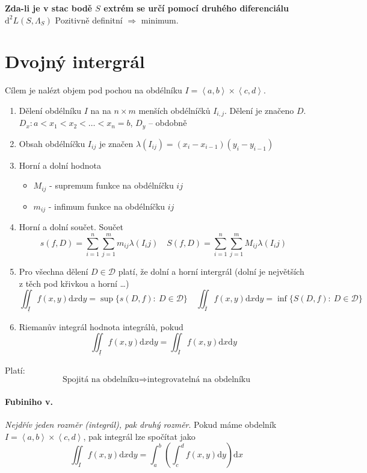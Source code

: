 \documentclass[a4paper, twoside,%
12pt]{article}
\newcommand{\dif}{\mathrm{d}}
\begin{document}
\textbf{Zda-li je v stac bodě $S$ extrém se určí pomocí druhého diferenciálu $\dif^2 L(S, \Lambda_S)$} Pozitivně definitní $\Rightarrow$ minimum.

\section{Dvojný intergrál}

Cílem je nalézt objem pod pochou na obdélníku $I = \left< a,b\right> \times \left<c,d\right>$. 

\begin{enumerate}
    \item Dělení obdélníku $I$ na na $n\times m$ menších obdélníčků $I_{i,j}$. Dělení je značeno $D$. $D_x: a<x_1<x_2<\dots<x_n=b$, $D_y$ -- obdobně 
    \item Obsah obdélníčku $I_{ij}$ je značen $\lambda(I_{ij}) = (x_i - x_{i-1})(y_i - y_{i-1})$
    \item Horní a dolní hodnota 
    \begin{itemize}
        \item $M_{ij}$ - supremum funkce na obdélníčku $ij$
        \item $m_{ij}$ - infimum funkce na obdélníčku $ij$
    \end{itemize}
    \item Horní a dolní součet. Součet 
    $$s(f,D) = \sum_{i=1}^n \sum_{j=1}^m m_{ij} \lambda(I_ij) \quad S(f,D) = \sum_{i=1}^n \sum_{j=1}^m M_{ij} \lambda(I_ij)$$
    \item Pro všechna dělení $D \in \mathscr{D}$ platí, že dolní a horní intergrál (dolní je největších z těch pod křivkou a horní \dots)
    $$ \iint_{\underline{I}} f(x,y)\dif x\dif y = \sup\lbrace s(D,f): \: D \in \mathscr{D} \rbrace \quad \iint_{\overline{I}} f(x,y)\dif x\dif y = \inf\lbrace S(D,f): \: D \in \mathscr{D} \rbrace $$
    \item Riemanův integrál hodnota integrálů, pokud 
    $$ \iint_{\underline{I}} f(x,y)\dif x\dif y = \iint_{\overline{I}} f(x,y)\dif x\dif y $$
\end{enumerate}

Platí:
$$ \text{Spojitá na obdelníku} \Rightarrow \text{integrovatelná na obdelníku}$$

\paragraph{Fubiniho v.} \emph{Nejdřív jeden rozměr (integrál), pak druhý rozměr}. Pokud máme obdelník $I = \left< a,b\right> \times \left<c,d\right>$, pak integrál lze spočítat jako 
$$ \iint_I f(x,y)\dif x\dif y = \int_a^b \left( \int_c^d f(x,y) \dif y\right) \dif x  $$
\end{document}
